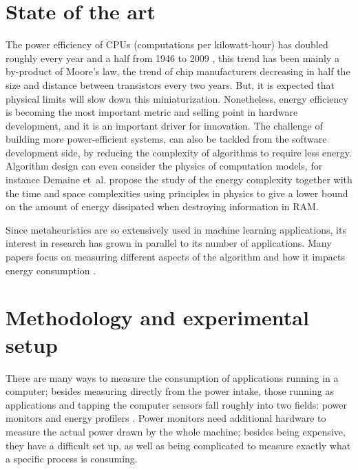 \documentclass[a4paper,twoside]{article}
\begin{document}
\section{State of the art}


The power efficiency of CPUs (computations per kilowatt-hour) has doubled
roughly every year and a half from 1946 to 2009 \cite{koomey2011web}, this trend
has been mainly a by-product of Moore's law, the trend of chip manufacturers
decreasing in half the size and distance between transistors every two
years. But, it is expected that physical limits will slow down this
miniaturization. Nonetheless, energy efficiency is becoming the most important
metric and selling point in hardware development, and it is an important driver
for innovation. The challenge of building more power-efficient systems, can also
be tackled from the software development side, by reducing the complexity of
algorithms to require less energy. Algorithm design can even consider the
physics of computation models, for instance Demaine et~al. \cite{demaine2016energy} propose the study of the energy complexity together
with the time and space complexities using principles in physics to give a lower
bound on the amount of energy dissipated when destroying information in RAM.

Since metaheuristics are so extensively used in machine learning applications,
its interest in research has grown in parallel to its number of applications.
Many papers focus on measuring different aspects of the algorithm and how it
impacts energy consumption \cite{diaz2022population}.

\section{Methodology and experimental setup}
\label{sec:setup}

There are many ways to measure the consumption of applications running in a
computer; besides measuring directly from the power intake, those running as
applications and tapping the computer sensors fall roughly into two fields:
power monitors and energy profilers \cite{cruz21}. Power monitors need
additional hardware to measure the actual power drawn by the whole machine;
besides being expensive, they have a difficult set up, as well as being
complicated to measure exactly what a specific process is consuming.
\end{document}
